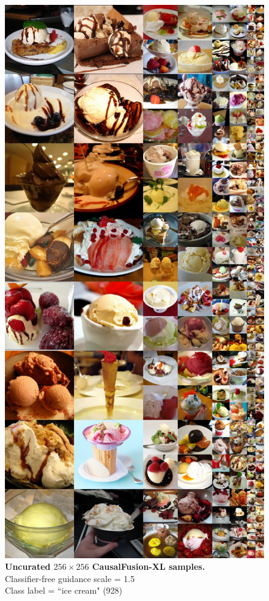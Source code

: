 \begin{figure}\centering
\includegraphics[width=\linewidth]{figs/xl256_928_cfg1.5.jpg}
\caption{\textbf{Uncurated $256\times256$ CausalFusion-XL samples.} \\Classifier-free guidance scale = 1.5\\Class label = ``ice cream" (928)}\vspace{-2mm}
\label{fig:samples256_5}
\end{figure}


